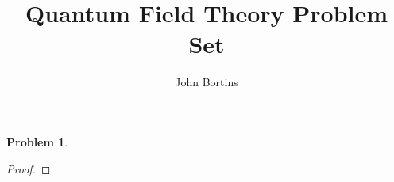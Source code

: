 \documentclass[letterpaper]{article}
\title{Quantum Field Theory Problem Set}
\author{John Bortins}
\theoremstyle{definition}
\newtheorem{prob}{Problem}[section]
\begin{document}
\maketitle{}


\begin{prob}
\end{prob}

\begin{proof}
\end{proof}
\end{document}
